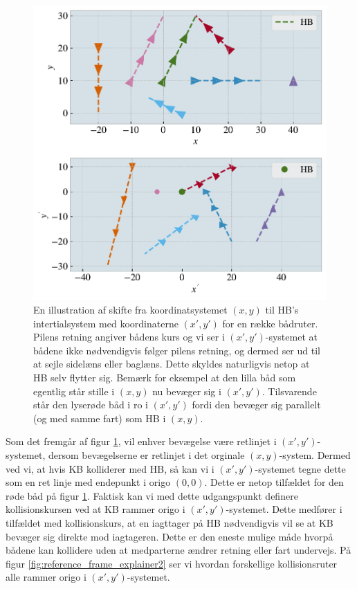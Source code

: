 \documentclass[%
 reprint,
nofootinbib,
aps,
]{revtex4-1}
\begin{document}
\begin{figure}[H]
  \includegraphics[width=\linewidth]{figures/reference_frame_explainer.pdf}
  \caption{En illustration af skifte fra koordinatsystemet $(x,y)$ til HB's intertialsystem med koordinaterne  $(x',y')$ for en række bådruter. Pilens retning angiver bådens kurs og vi ser i $(x',y')$-systemet at bådene ikke nødvendigvis følger pilens retning, og dermed ser ud til at sejle sidelæns eller baglæns. Dette skyldes naturligvis netop at HB selv flytter sig. Bemærk for eksempel at den lilla båd som egentlig står stille i $(x,y)$ nu bevæger sig i  $(x',y')$. Tilsvarende står den lyserøde båd i ro i $(x',y')$ fordi den bevæger sig parallelt (og med samme fart) som HB i $(x,y)$.}
  \label{fig:reference_frame_explainer}
\end{figure}

Som det fremgår af figur \ref{fig:reference_frame_explainer}, vil enhver bevægelse være retlinjet i $(x',y')$-systemet, dersom bevægelserne er retlinjet i det orginale $(x,y)$-system. Dermed ved vi, at hvis KB kolliderer med HB, så kan vi i $(x',y')$-systemet tegne dette som en ret linje med endepunkt i origo $(0,0)$. Dette er netop tilfældet for den røde båd på figur \ref{fig:reference_frame_explainer}. Faktisk kan vi med dette udgangspunkt definere kollisionskursen ved at KB rammer origo i $(x',y')$-systemet. Dette medfører i tilfældet med kollisionskurs, at en iagttager på HB nødvendigvis vil se at KB bevæger sig direkte mod iagtageren. Dette er den eneste mulige måde hvorpå bådene kan kollidere uden at medparterne ændrer retning eller fart undervejs. På figur \ref{fig:reference_frame_explainer2} ser vi hvordan forskellige kollisionsruter alle rammer origo i $(x',y')$-systemet.
\end{document}
